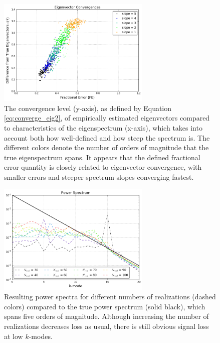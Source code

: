 \begin{figure}
    \centering
	\includegraphics[width=0.65\textwidth]{plots/eigchar_1.png}    
	\caption{The convergence level (y-axis), as defined by Equation \eqref{eq:converge_eig2}, of empirically estimated eigenvectors compared to characteristics of the eigenspectrum (x-axis), which takes into account both how well-defined and how steep the spectrum is. The different colors denote the number of orders of magnitude that the true eigenspectrum spans. It appears that the defined fractional error quantity is closely related to eigenvector convergence, with smaller errors and steeper spectrum slopes converging fastest.}
    \label{fig:eigchar_1}
\end{figure}

\begin{figure}
    \centering
	\includegraphics[width=0.65\textwidth]{plots/eigchar_2.png}    
	\caption{Resulting power spectra for different numbers of realizations (dashed colors) compared to the true power spectrum (solid black), which spans five orders of magnitude. Although increasing the number of realizations decreases loss as usual, there is still obvious signal loss at low $k$-modes.}
    \label{fig:eigchar_2}
\end{figure}

